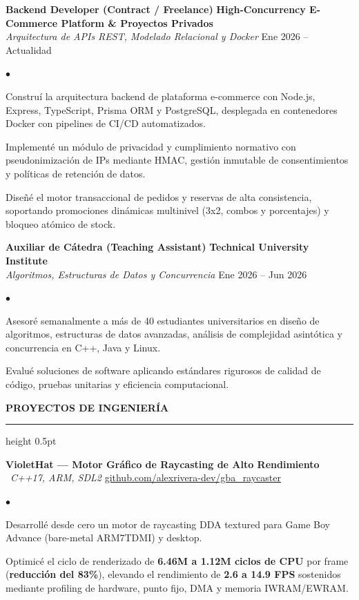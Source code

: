 \documentclass[10pt,letterpaper]{article}
\newcommand{\resumesection}[1]{%
  \vspace{2pt}%
  {\color{primary}\normalsize\bfseries\MakeUppercase{#1}}%
  \vspace{1pt}\hrule height 0.5pt\vspace{2pt}%
}
\renewenvironment{itemize}{%
  \begin{list}{\color{primary}$\bullet$}{%
    \setlength{\leftmargin}{1.1em}%
    \setlength{\itemsep}{0.5pt}%
    \setlength{\topsep}{1pt}%
    \setlength{\parsep}{0pt}%
    \setlength{\partopsep}{0pt}%
  }%
}{%
  \end{list}%
}
\begin{document}
\vspace{1.5pt}

\textbf{Backend Developer (Contract / Freelance)} \hfill \textbf{High-Concurrency E-Commerce Platform \& Proyectos Privados} \\
\textit{Arquitectura de APIs REST, Modelado Relacional y Docker} \hfill Ene 2026 -- Actualidad
\begin{itemize}
    \item Construí la arquitectura backend de plataforma e-commerce con Node.js, Express, TypeScript, Prisma ORM y PostgreSQL, desplegada en contenedores Docker con pipelines de CI/CD automatizados.
    \item Implementé un módulo de privacidad y cumplimiento normativo con pseudonimización de IPs mediante HMAC, gestión inmutable de consentimientos y políticas de retención de datos.
    \item Diseñé el motor transaccional de pedidos y reservas de alta consistencia, soportando promociones dinámicas multinivel (3x2, combos y porcentajes) y bloqueo atómico de stock.
\end{itemize}

\vspace{1.5pt}

\textbf{Auxiliar de Cátedra (Teaching Assistant)} \hfill \textbf{Technical University Institute} \\
\textit{Algoritmos, Estructuras de Datos y Concurrencia} \hfill Ene 2026 -- Jun 2026
\begin{itemize}
    \item Asesoré semanalmente a más de 40 estudiantes universitarios en diseño de algoritmos, estructuras de datos avanzadas, análisis de complejidad asintótica y concurrencia en C++, Java y Linux.
    \item Evalué soluciones de software aplicando estándares rigurosos de calidad de código, pruebas unitarias y eficiencia computacional.
\end{itemize}

\resumesection{Proyectos de Ingeniería}

\textbf{VioletHat — Motor Gráfico de Raycasting de Alto Rendimiento} \textbar\ \textit{C++17, ARM, SDL2} \hfill \href{https://github.com/alexrivera-dev/gba_raycaster}{github.com/alexrivera-dev/gba\_raycaster}
\begin{itemize}
    \item Desarrollé desde cero un motor de raycasting DDA textured para Game Boy Advance (bare-metal ARM7TDMI) y desktop.
    \item Optimicé el ciclo de renderizado de \textbf{6.46M a 1.12M ciclos de CPU} por frame (\textbf{reducción del 83\%}), elevando el rendimiento de \textbf{2.6 a 14.9 FPS} sostenidos mediante profiling de hardware, punto fijo, DMA y memoria IWRAM/EWRAM.
\end{itemize}
\end{document}
